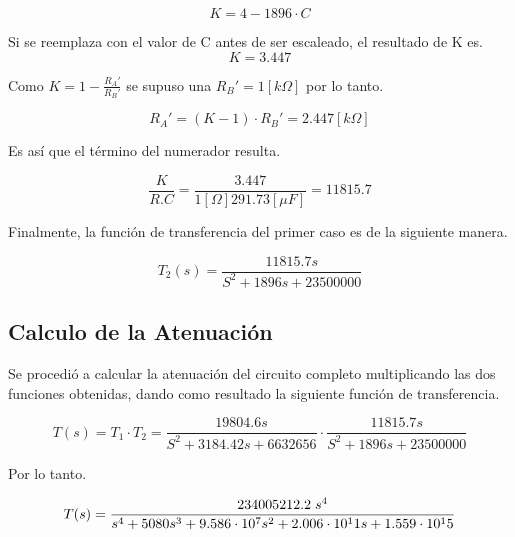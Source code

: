 \documentclass[12pt,A4paper,titlepage]{article}
\begin{document}
\begin{equation}
    K = 4 - 1 896\cdot C 
\end{equation}

\bigskip
\hspace{1mm} Si se reemplaza con el valor de C antes de ser escaleado, el resultado de K es.
\begin{equation}
    K = 3.447
\end{equation}

\bigskip
\hspace{1mm} Como \(K = 1 - \frac{R_A'}{R_B'}\) se supuso una \(R_B' = 1 [k\Omega]\) por lo tanto.

\begin{equation}
    R_A' = (K - 1) \cdot R_B' = 2.447[k \Omega]
\end{equation}

\bigskip
\hspace{1mm} Es así que el término del numerador resulta.

\begin{equation}
    \frac{K}{R.C} = \frac{3.447}{1[\Omega] 291.73[\mu F]} = 11 815.7
\end{equation}

\bigskip
\hspace{1mm} Finalmente, la función de transferencia del primer caso es de la siguiente manera.

\begin{equation}
    \boxed{
    T_2 (s) = \frac{11 815.7 s}{S^2 + 1 896 s + 23 500 000}
    }
\end{equation}

\newpage
\subsection{Calculo de la Atenuación}
\hspace{1mm} Se procedió a calcular la atenuación del circuito completo multiplicando las dos funciones obtenidas, dando como resultado la siguiente función de transferencia.

\begin{equation}
    T (s) = T_1 \cdot T_2 = \frac{19 804.6 s}{S^2 + 3 184.42 s + 6 632 656} \cdot \frac{11 815.7 s}{S^2 + 1 896 s + 23 500 000}
\end{equation}

\hspace{1mm} Por lo tanto.

\begin{equation}
    T (s) = \frac{234 005 212.2 \hspace{1mm} s^4}{s^4 + 5080 s^3 + 9.586 \cdot 10^7 s^2 + 2.006 \cdot 10^11 s + 1.559 \cdot 10^15}
\end{equation}
\end{document}
